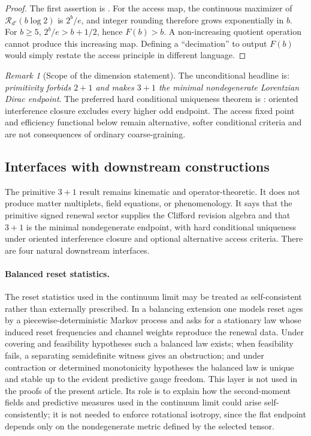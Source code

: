 \documentclass[11pt]{article}
\theoremstyle{definition}
\theoremstyle{remark}
\newtheorem{remark}[theorem]{Remark}
\newcommand{\Acc}{\mathcal{R}}
\begin{document}
\begin{proof}
The first assertion is .  For the access map, the
continuous maximizer of \(\Acc_{d'}(b\log2)\) is \(2^b/e\), and integer rounding
therefore grows exponentially in \(b\).  For \(b\ge5\), \(2^b/e>b+1/2\), hence
\(F(b)>b\).  A non-increasing quotient operation cannot produce this increasing
map.  Defining a ``decimation'' to output \(F(b)\) would simply restate the
access principle in different language.
\end{proof}

\begin{remark}[Scope of the dimension statement]
\label{rem:dimension-status}
The unconditional headline is: \emph{primitivity forbids \(2+1\) and makes
\(3+1\) the minimal nondegenerate Lorentzian Dirac endpoint}.  The preferred hard
conditional uniqueness theorem is
: oriented interference closure
excludes every higher odd endpoint.  The access fixed point and efficiency
functional below remain alternative, softer conditional criteria and are not
consequences of ordinary coarse-graining.
\end{remark}

\subsection{Interfaces with downstream constructions}
\label{subsec:downstream-interfaces}

The primitive \(3+1\) result remains kinematic and operator-theoretic.  It does
not produce matter multiplets, field equations, or phenomenology.  It says that
the primitive signed renewal sector supplies the Clifford revision algebra and
that \(3+1\) is the minimal nondegenerate endpoint, with hard conditional
uniqueness under oriented interference closure and optional alternative access
criteria.  There are four natural downstream
interfaces.

\paragraph{Balanced reset statistics.}
The reset statistics used in the continuum limit may be treated as
self-consistent rather than externally prescribed.  In a balancing extension one
models reset ages by a piecewise-deterministic Markov process and asks for a
stationary law whose induced reset frequencies and channel weights reproduce the
renewal data.  Under covering and feasibility hypotheses such a balanced law
exists; when feasibility fails, a separating semidefinite witness gives an
obstruction; and under contraction or determined monotonicity hypotheses the
balanced law is unique and stable up to the evident predictive gauge freedom.
This layer is not used in the proofs of the present article.  Its role is to
explain how the second-moment fields and predictive measures used in the
continuum limit could arise self-consistently; it is not needed to enforce
rotational isotropy, since the flat endpoint depends only on the nondegenerate
metric defined by the selected tensor.
\end{document}
